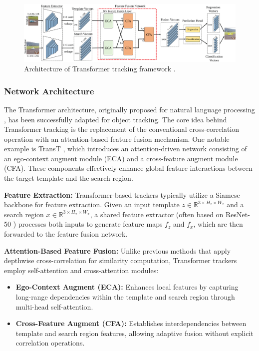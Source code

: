 \begin{figure}[h]
    \centering
    \includegraphics[width=1\linewidth]{images/vitt_architecture.png}
    \caption{Architecture of Transformer tracking framework \cite{chen2021transformer}.}
    \label{fig:transt_architecture}
\end{figure}

\subsubsection{Network Architecture} 
The Transformer architecture, originally proposed for natural language processing \cite{vaswani2017attention}, has been successfully adapted for object tracking. The core idea behind Transformer tracking is the replacement of the conventional cross-correlation operation with an attention-based feature fusion mechanism. One notable example is TransT \cite{chen2021transformer}, which introduces an attention-driven network consisting of an ego-context augment module (ECA) and a cross-feature augment module (CFA). These components effectively enhance global feature interactions between the target template and the search region.


\textbf{Feature Extraction:} Transformer-based trackers typically utilize a Siamese backbone for feature extraction. Given an input template $z \in \mathbb{R}^{3 \times H_z \times W_z}$ and a search region $x \in \mathbb{R}^{3 \times H_x \times W_x}$, a shared feature extractor (often based on ResNet-50 \cite{he2016deep}) processes both inputs to generate feature maps $f_z$ and $f_x$, which are then forwarded to the feature fusion network.

\textbf{Attention-Based Feature Fusion: }Unlike previous methods that apply depthwise cross-correlation for similarity computation, Transformer trackers employ self-attention and cross-attention modules:
\begin{itemize}
    \item \textbf{Ego-Context Augment (ECA):} Enhances local features by capturing long-range dependencies within the template and search region through multi-head self-attention.
    \item \textbf{Cross-Feature Augment (CFA):} Establishes interdependencies between template and search region features, allowing adaptive fusion without explicit correlation operations.
\end{itemize}

